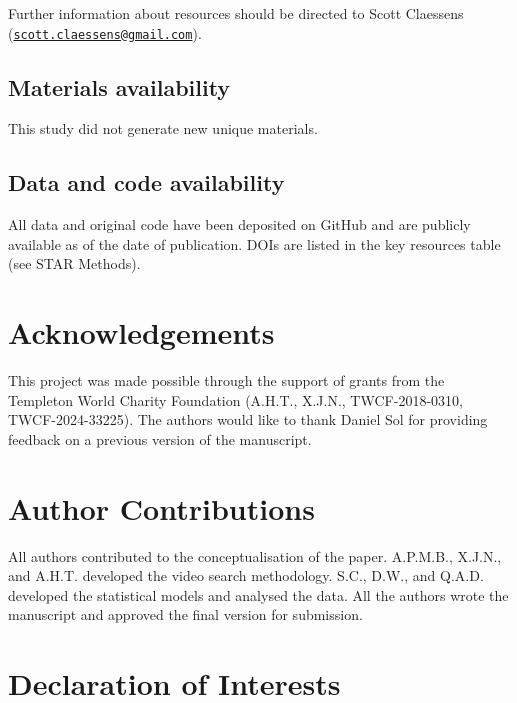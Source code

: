 \documentclass[
  man, donotrepeattitle,floatsintext]{apa6}
\begin{document}
Further information about resources should be directed to Scott Claessens
(\href{mailto:scott.claessens@gmail.com}{\nolinkurl{scott.claessens@gmail.com}}).

\hypertarget{materials-availability}{%
\subsection{Materials availability}\label{materials-availability}}

This study did not generate new unique materials.

\hypertarget{data-and-code-availability}{%
\subsection{Data and code availability}\label{data-and-code-availability}}

All data and original code have been deposited on GitHub and are publicly
available as of the date of publication. DOIs are listed in the key resources
table (see STAR Methods).

\hypertarget{acknowledgements}{%
\section{Acknowledgements}\label{acknowledgements}}

This project was made possible through the support of grants from the Templeton
World Charity Foundation (A.H.T., X.J.N., TWCF-2018-0310, TWCF-2024-33225). The
authors would like to thank Daniel Sol for providing feedback on a previous
version of the manuscript.

\hypertarget{author-contributions}{%
\section{Author Contributions}\label{author-contributions}}

All authors contributed to the conceptualisation of the paper. A.P.M.B., X.J.N.,
and A.H.T. developed the video search methodology. S.C., D.W., and Q.A.D.
developed the statistical models and analysed the data. All the authors wrote
the manuscript and approved the final version for submission.

\hypertarget{declaration-of-interests}{%
\section{Declaration of Interests}\label{declaration-of-interests}}
\end{document}
